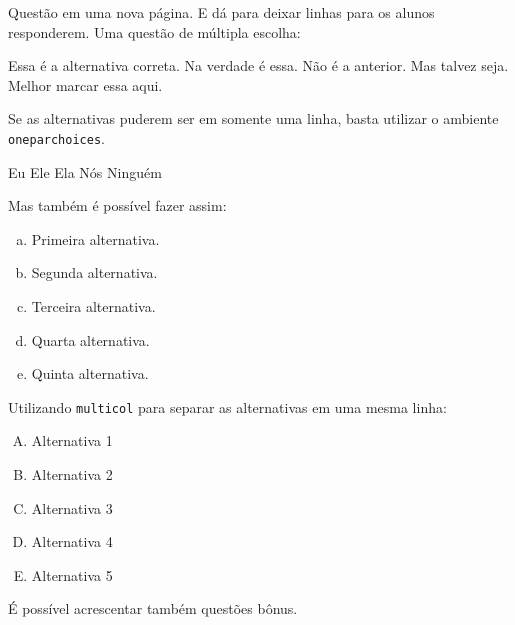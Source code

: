 \documentclass[a4paper, 11pt, addpoints]{exam}
\begin{document}
\begin{questions}
		\newpage
		\question
		Questão em uma nova página. E dá para deixar linhas para os alunos responderem.
		\fillwithlines{5cm}
		\question
		Uma questão de múltipla escolha:
			\begin{choices}
				\choice Essa é a alternativa correta.
				\choice Na verdade é essa.
				\choice Não é a anterior.
				\choice Mas talvez seja.
				\choice Melhor marcar essa aqui.
			\end{choices}
		\question
		Se as alternativas puderem ser em somente uma linha, basta utilizar o ambiente \texttt{oneparchoices}.
			\begin{oneparchoices}
				\choice Eu
				\choice Ele
				\choice Ela
				\choice Nós
				\choice Ninguém
			\end{oneparchoices}
		\question
		Mas também é possível fazer assim:
			\begin{enumerate}[a)]
				\item Primeira alternativa.
				\item Segunda alternativa.
				\item Terceira alternativa.
				\item Quarta alternativa.
				\item Quinta alternativa.
			\end{enumerate}
		\question
		Utilizando \texttt{multicol} para separar as alternativas em uma mesma linha:
			\begin{multicols}{5}
				\begin{enumerate}[(A)]
					\item Alternativa 1
					\item Alternativa 2
					\item Alternativa 3
					\item Alternativa 4
					\item Alternativa 5
				\end{enumerate}
			\end{multicols}
		\bonusquestion[1]
		É possível acrescentar também questões bônus.
	\end{questions}
	
\end{document}
